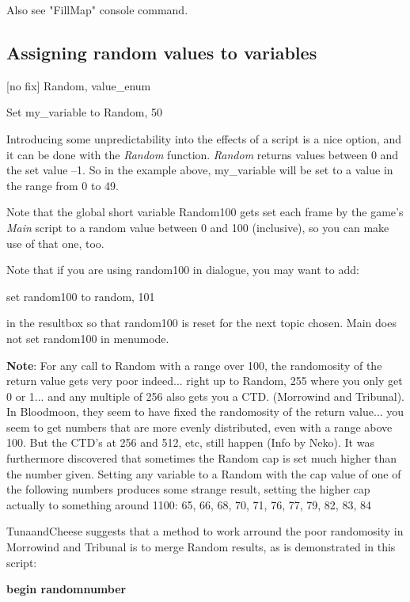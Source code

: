 

Also see "FillMap" console command.

\hypertarget{assigning-random-values-to-variables}{%
\subsection{Assigning random values to
variables}\label{assigning-random-values-to-variables}}

{[}no fix{]} Random, value\_enum

Set my\_variable to Random, 50

Introducing some unpredictability into the effects of a script is a nice
option, and it can be done with the \emph{Random} function.
\emph{Random} returns values between 0 and the set value --1. So in the
example above, my\_variable will be set to a value in the range from 0
to 49.

Note that the global short variable Random100 gets set each frame by the
game's \emph{Main} script to a random value between 0 and 100
(inclusive), so you can make use of that one, too.

Note that if you are using random100 in dialogue, you may want to add:

set random100 to random, 101

in the resultbox so that random100 is reset for the next topic chosen.
Main does not set random100 in menumode.

\textbf{Note}: For any call to Random with a range over 100, the
randomosity of the return value gets very poor indeed... right up to
Random, 255 where you only get 0 or 1... and any multiple of 256 also
gets you a CTD. (Morrowind and Tribunal). In Bloodmoon, they seem to
have fixed the randomosity of the return value... you seem to get
numbers that are more evenly distributed, even with a range above 100.
But the CTD's at 256 and 512, etc, still happen (Info by Neko). It was
furthermore discovered that sometimes the Random cap is set much higher
than the number given. Setting any variable to a Random with the cap
value of one of the following numbers produces some strange result,
setting the higher cap actually to something around 1100: 65, 66, 68,
70, 71, 76, 77, 79, 82, 83, 84

TunaandCheese suggests that a method to work arround the poor
randomosity in Morrowind and Tribunal is to merge Random results, as is
demonstrated in this script:

\textbf{begin randomnumber}

